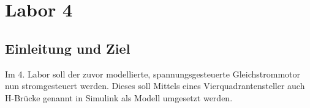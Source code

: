 \section{Labor 4}
\subsection{Einleitung und Ziel}

Im 4. Labor soll der zuvor modellierte, spannungsgesteuerte
Gleichstrommotor nun stromgesteuert werden. Dieses soll Mittels
eines Vierquadrantensteller auch H-Brücke genannt in Simulink
als Modell umgesetzt werden.